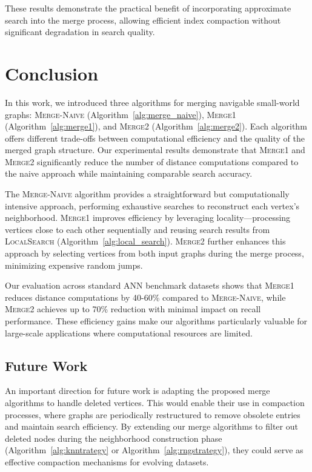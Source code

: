 \documentclass{article}
\begin{document}
These results demonstrate the practical benefit of incorporating approximate search into the merge process, allowing efficient index compaction without significant degradation in search quality.

\section{Conclusion}

In this work, we introduced three algorithms for merging navigable small-world graphs: \textsc{Merge-Naive} (Algorithm~\ref{alg:merge_naive}), \textsc{Merge1} (Algorithm~\ref{alg:merge1}), and \textsc{Merge2} (Algorithm~\ref{alg:merge2}). Each algorithm offers different trade-offs between computational efficiency and the quality of the merged graph structure. Our experimental results demonstrate that \textsc{Merge1} and \textsc{Merge2} significantly reduce the number of distance computations compared to the naive approach while maintaining comparable search accuracy.

The \textsc{Merge-Naive} algorithm provides a straightforward but computationally intensive approach, performing exhaustive searches to reconstruct each vertex's neighborhood. \textsc{Merge1} improves efficiency by leveraging locality—processing vertices close to each other sequentially and reusing search results from \textsc{LocalSearch} (Algorithm~\ref{alg:local_search}). \textsc{Merge2} further enhances this approach by selecting vertices from both input graphs during the merge process, minimizing expensive random jumps.

Our evaluation across standard ANN benchmark datasets shows that \textsc{Merge1} reduces distance computations by 40-60\% compared to \textsc{Merge-Naive}, while \textsc{Merge2} achieves up to 70\% reduction with minimal impact on recall performance. These efficiency gains make our algorithms particularly valuable for large-scale applications where computational resources are limited.

\subsection{Future Work}

An important direction for future work is adapting the proposed merge algorithms to handle deleted vertices. This would enable their use in compaction processes, where graphs are periodically restructured to remove obsolete entries and maintain search efficiency. By extending our merge algorithms to filter out deleted nodes during the neighborhood construction phase (Algorithm~\ref{alg:knntrategy} or Algorithm~\ref{alg:rngstrategy}), they could serve as effective compaction mechanisms for evolving datasets.
\end{document}
